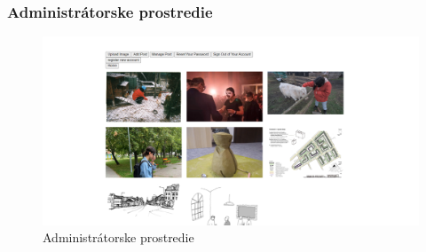 \begin{frame}\frametitle{Administrátorske prostredie}
  \begin{figure}[htb]
    \centering
    \includegraphics[scale=0.30]{admin.png}
    \caption{Administrátorske prostredie}
  \end{figure}
\end{frame}